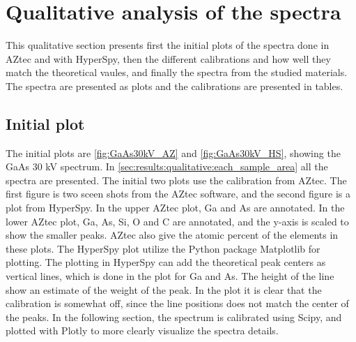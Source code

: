 













\section{Qualitative analysis of the spectra}
\label{sec:results:qualitative}


This qualitative section presents first the initial plots of the spectra done in AZtec and with HyperSpy, then the different calibrations and how well they match the theoretical vaules, and finally the spectra from the studied materials.
The spectra are presented as plots and the calibrations are presented in tables.



\subsection{Initial plot}
\label{sec:results:qualitative:initial_plot}

The initial plots are \cref{fig:GaAs30kV_AZ} and \cref{fig:GaAs30kV_HS}, showing the GaAs 30 kV spectrum.
In \cref{sec:results:qualitative:each_sample_area} all the spectra are presented.
The initial two plots use the calibration from AZtec.
The first figure is two sceen shots from the AZtec software, and the second figure is a plot from HyperSpy.
In the upper AZtec plot, Ga and As are annotated.
In the lower AZtec plot, Ga, As, Si, O and C are annotated, and the y-axis is scaled to show the smaller peaks.
AZtec also give the atomic percent of the elements in these plots.
The HyperSpy plot utilize the Python package Matplotlib for plotting.
The plotting in HyperSpy can add the theoretical peak centers as vertical lines, which is done in the plot for Ga and As.
The height of the line show an estimate of the weight of the peak.
In the plot it is clear that the calibration is somewhat off, since the line positions does not match the center of the peaks.
In the following section, the spectrum is calibrated using Scipy, and plotted with Plotly to more clearly visualize the spectra details.

